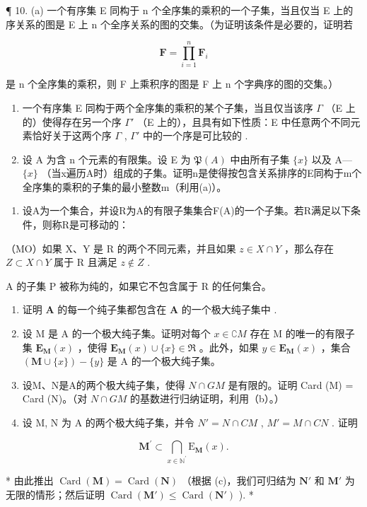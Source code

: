 ¶ 10. (a) 一个有序集 E 同构于 n 个全序集的乘积的一个子集，当且仅当 E 上的序关系的图是 E 上 n 个全序关系的图的交集。（为证明该条件是必要的，证明若

\[
\mathbf {F} = \prod_ {i = 1} ^ {n} \mathbf {F} _ {i}
\]

是 n 个全序集的乘积，则 F 上乘积序的图是 F 上 n 个字典序的图的交集。）

\begin{enumerate}
\def\labelenumi{(\alph{enumi})}
\setcounter{enumi}{1}
\item
  一个有序集 E 同构于两个全序集的乘积的某个子集，当且仅当该序 \(\Gamma\) （E 上的）使得存在另一个序 \(\Gamma'\) （E 上的），且具有如下性质：E 中任意两个不同元素恰好关于这两个序 \(\Gamma\) , \(\Gamma'\) 中的一个序是可比较的 .
\item
  设 A 为含 n 个元素的有限集。设 E 为 \(\mathfrak{P}(A)\) 中由所有子集 \(\{x\}\) 以及 A--- \(\{x\}\) （当x遍历A时）组成的子集。证明n是使得按包含关系排序的E同构于m个全序集的乘积的子集的最小整数m（利用(a)）。
\end{enumerate}

\begin{enumerate}
\def\labelenumi{\arabic{enumi}.}
\setcounter{enumi}{10}
\tightlist
\item
  设A为一个集合，并设R为A的有限子集集合F(A)的一个子集。若R满足以下条件，则称R是可移动的：
\end{enumerate}

（MO）如果 X、Y 是 R 的两个不同元素，并且如果 \(z \in X \cap Y\) ，那么存在 \(Z \subset X \cap Y\) 属于 R 且满足 \(z \notin Z\) .

A 的子集 P 被称为纯的，如果它不包含属于 R 的任何集合。

\begin{enumerate}
\def\labelenumi{(\alph{enumi})}
\item
  证明 \(\mathbf{A}\) 的每一个纯子集都包含在 \(\mathbf{A}\) 的一个极大纯子集中 .
\item
  设 M 是 A 的一个极大纯子集。证明对每个 \(x \in \complement M\) 存在 M 的唯一的有限子集 \(\mathbf{E}_{\mathbf{M}}(x)\) ，使得 \(\mathbf{E}_{\mathbf{M}}(x) \cup \{x\} \in \Re\) 。此外，如果 \(y \in \mathbf{E}_{\mathbf{M}}(x)\) ，集合 \((\mathbf{M} \cup \{x\}) - \{y\}\) 是 A 的一个极大纯子集。
\item
  设M、N是A的两个极大纯子集，使得 \(N \cap GM\) 是有限的。证明 Card (M) = Card (N)。（对 \(N \cap GM\) 的基数进行归纳证明，利用（b）。）
\item
  设 M, N 为 A 的两个极大纯子集，并令 \(N' = N \cap CM\) , \(M' = M \cap CN\) . 证明
\end{enumerate}

\[
\mathbf {M} ^ {\prime} \subset \bigcap_ {x \in \mathbb {N} ^ {\prime}} \mathrm{E} _ {\mathbf {M}} (x).
\]

* 由此推出 \(\operatorname{Card}(\mathbf{M}) = \operatorname{Card}(\mathbf{N})\) （根据 (c)，我们可归结为 \(\mathbf{N}'\) 和 \(\mathbf{M}'\) 为无限的情形；然后证明 \(\operatorname{Card}(\mathbf{M}') \leqslant \operatorname{Card}(\mathbf{N}')\) ). *

